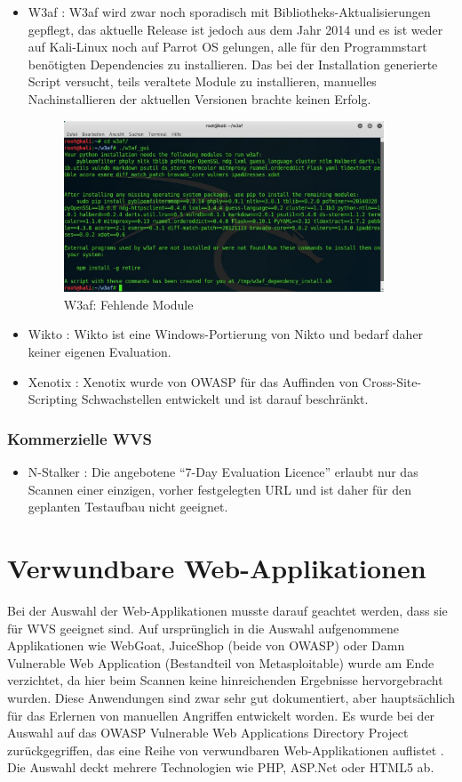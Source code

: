 \documentclass[12pt,oneside,a4paper,parskip]{scrbook}
\begin{document}
\begin{itemize}
      \item W3af \cite{W3af}: W3af wird zwar noch sporadisch mit Bibliotheks-Aktualisierungen gepflegt, das aktuelle Release ist jedoch aus dem Jahr 2014 und es ist weder auf Kali-Linux noch auf Parrot OS gelungen, alle für den Programmstart benötigten Dependencies zu installieren. Das bei der Installation generierte Script versucht, teils veraltete Module zu installieren, manuelles Nachinstallieren der aktuellen Versionen brachte keinen Erfolg.
      \begin{figure}[H]
        \centering
        \includegraphics[width=0.9\textwidth]{Images/w3af}
        \caption[W3af: Fehlende Module]{W3af: Fehlende Module}
      \end{figure}
      \item Wikto \cite{Wikto}: Wikto ist eine Windows-Portierung von Nikto und bedarf daher keiner eigenen Evaluation.
      \item Xenotix \cite{Xenotix}: Xenotix wurde von OWASP für das Auffinden von Cross-Site-Scripting Schwachstellen entwickelt und ist darauf beschränkt.
    \end{itemize}
    \subsubsection{Kommerzielle WVS}
      \begin{itemize}
        \item N-Stalker \cite{Stalker}: Die angebotene ``7-Day Evaluation Licence'' erlaubt nur das Scannen einer einzigen, vorher festgelegten URL und ist daher für den geplanten Testaufbau nicht geeignet.
      \end{itemize}
\newpage
\section{Verwundbare Web-Applikationen}
  Bei der Auswahl der Web-Applikationen musste darauf geachtet werden, dass sie für WVS geeignet sind. Auf ursprünglich in die Auswahl aufgenommene Applikationen wie WebGoat, JuiceShop (beide von OWASP) oder Damn Vulnerable Web Application (Bestandteil von Metasploitable) wurde am Ende verzichtet, da hier beim Scannen keine hinreichenden Ergebnisse hervorgebracht wurden. Diese Anwendungen  sind zwar sehr gut dokumentiert, aber hauptsächlich für das Erlernen von manuellen Angriffen entwickelt worden. Es wurde bei der Auswahl auf das OWASP Vulnerable Web Applications Directory Project zurückgegriffen, das eine Reihe von verwundbaren Web-Applikationen auflistet \cite{OWASPWebApps}. Die Auswahl deckt mehrere Technologien wie PHP, ASP.Net oder HTML5 ab.
\end{document}
